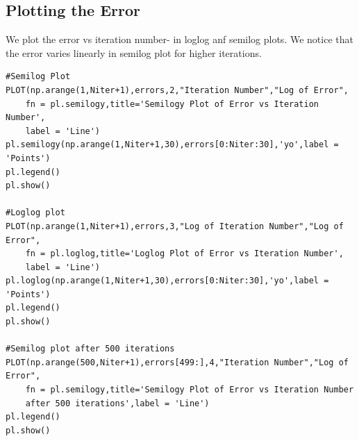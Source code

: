 \documentclass[11pt, a4paper]{article}
\begin{document}
\subsection{Plotting the Error}
We plot the error vs iteration number- in loglog anf semilog plots.
We notice that the error varies linearly in semilog plot for higher iterations.
\begin{verbatim}
#Semilog Plot
PLOT(np.arange(1,Niter+1),errors,2,"Iteration Number","Log of Error",
	fn = pl.semilogy,title='Semilogy Plot of Error vs Iteration Number',
	label = 'Line')
pl.semilogy(np.arange(1,Niter+1,30),errors[0:Niter:30],'yo',label = 'Points')
pl.legend()
pl.show()

#Loglog plot
PLOT(np.arange(1,Niter+1),errors,3,"Log of Iteration Number","Log of Error",
	fn = pl.loglog,title='Loglog Plot of Error vs Iteration Number',
	label = 'Line')
pl.loglog(np.arange(1,Niter+1,30),errors[0:Niter:30],'yo',label = 'Points')
pl.legend()
pl.show()

#Semilog plot after 500 iterations
PLOT(np.arange(500,Niter+1),errors[499:],4,"Iteration Number","Log of Error",
	fn = pl.semilogy,title='Semilogy Plot of Error vs Iteration Number 
	after 500 iterations',label = 'Line')
pl.legend()
pl.show()
\end{verbatim}
\end{document}
